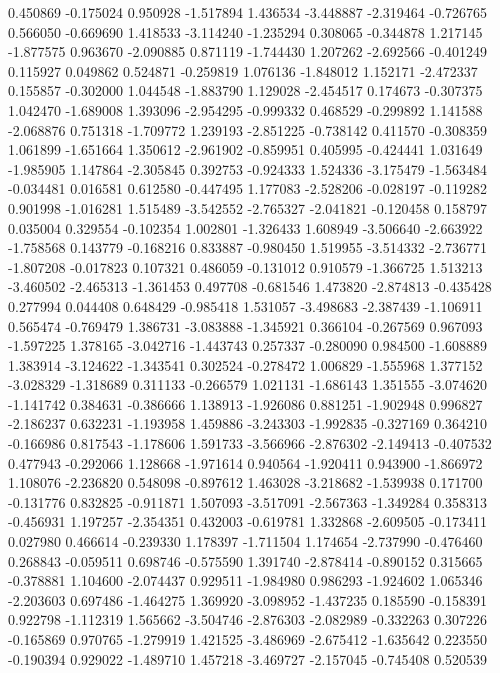 0.450869
-0.175024
0.950928
-1.517894
1.436534
-3.448887
-2.319464
-0.726765
0.566050
-0.669690
1.418533
-3.114240
-1.235294
0.308065
-0.344878
1.217145
-1.877575
0.963670
-2.090885
0.871119
-1.744430
1.207262
-2.692566
-0.401249
0.115927
0.049862
0.524871
-0.259819
1.076136
-1.848012
1.152171
-2.472337
0.155857
-0.302000
1.044548
-1.883790
1.129028
-2.454517
0.174673
-0.307375
1.042470
-1.689008
1.393096
-2.954295
-0.999332
0.468529
-0.299892
1.141588
-2.068876
0.751318
-1.709772
1.239193
-2.851225
-0.738142
0.411570
-0.308359
1.061899
-1.651664
1.350612
-2.961902
-0.859951
0.405995
-0.424441
1.031649
-1.985905
1.147864
-2.305845
0.392753
-0.924333
1.524336
-3.175479
-1.563484
-0.034481
0.016581
0.612580
-0.447495
1.177083
-2.528206
-0.028197
-0.119282
0.901998
-1.016281
1.515489
-3.542552
-2.765327
-2.041821
-0.120458
0.158797
0.035004
0.329554
-0.102354
1.002801
-1.326433
1.608949
-3.506640
-2.663922
-1.758568
0.143779
-0.168216
0.833887
-0.980450
1.519955
-3.514332
-2.736771
-1.807208
-0.017823
0.107321
0.486059
-0.131012
0.910579
-1.366725
1.513213
-3.460502
-2.465313
-1.361453
0.497708
-0.681546
1.473820
-2.874813
-0.435428
0.277994
0.044408
0.648429
-0.985418
1.531057
-3.498683
-2.387439
-1.106911
0.565474
-0.769479
1.386731
-3.083888
-1.345921
0.366104
-0.267569
0.967093
-1.597225
1.378165
-3.042716
-1.443743
0.257337
-0.280090
0.984500
-1.608889
1.383914
-3.124622
-1.343541
0.302524
-0.278472
1.006829
-1.555968
1.377152
-3.028329
-1.318689
0.311133
-0.266579
1.021131
-1.686143
1.351555
-3.074620
-1.141742
0.384631
-0.386666
1.138913
-1.926086
0.881251
-1.902948
0.996827
-2.186237
0.632231
-1.193958
1.459886
-3.243303
-1.992835
-0.327169
0.364210
-0.166986
0.817543
-1.178606
1.591733
-3.566966
-2.876302
-2.149413
-0.407532
0.477943
-0.292066
1.128668
-1.971614
0.940564
-1.920411
0.943900
-1.866972
1.108076
-2.236820
0.548098
-0.897612
1.463028
-3.218682
-1.539938
0.171700
-0.131776
0.832825
-0.911871
1.507093
-3.517091
-2.567363
-1.349284
0.358313
-0.456931
1.197257
-2.354351
0.432003
-0.619781
1.332868
-2.609505
-0.173411
0.027980
0.466614
-0.239330
1.178397
-1.711504
1.174654
-2.737990
-0.476460
0.268843
-0.059511
0.698746
-0.575590
1.391740
-2.878414
-0.890152
0.315665
-0.378881
1.104600
-2.074437
0.929511
-1.984980
0.986293
-1.924602
1.065346
-2.203603
0.697486
-1.464275
1.369920
-3.098952
-1.437235
0.185590
-0.158391
0.922798
-1.112319
1.565662
-3.504746
-2.876303
-2.082989
-0.332263
0.307226
-0.165869
0.970765
-1.279919
1.421525
-3.486969
-2.675412
-1.635642
0.223550
-0.190394
0.929022
-1.489710
1.457218
-3.469727
-2.157045
-0.745408
0.520539
